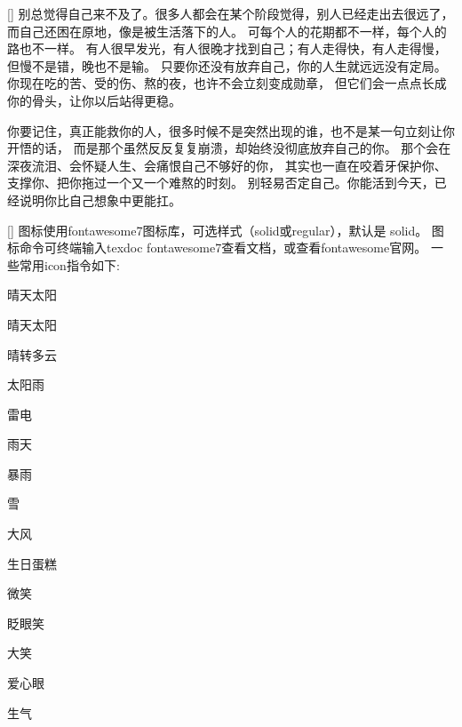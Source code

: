 \documentclass{diary}
\begin{document}
\Address
{}[\faCloudRain]%
别总觉得自己来不及了。很多人都会在某个阶段觉得，别人已经走出去很远了，而自己还困在原地，像是被生活落下的人。
可每个人的花期都不一样，每个人的路也不一样。
有人很早发光，有人很晚才找到自己；有人走得快，有人走得慢，但慢不是错，晚也不是输。
只要你还没有放弃自己，你的人生就远远没有定局。
你现在吃的苦、受的伤、熬的夜，也许不会立刻变成勋章，
但它们会一点点长成你的骨头，让你以后站得更稳。

你要记住，真正能救你的人，很多时候不是突然出现的谁，也不是某一句立刻让你开悟的话，
而是那个虽然反反复复崩溃，却始终没彻底放弃自己的你。
那个会在深夜流泪、会怀疑人生、会痛恨自己不够好的你，
其实也一直在咬着牙保护你、支撑你、把你拖过一个又一个难熬的时刻。
别轻易否定自己。你能活到今天，已经说明你比自己想象中更能扛。

\Address[][家]
[\faCloudSun]%
图标使用fontawesome7图标库，可选样式（solid或regular），默认是 solid。
图标命令可终端输入texdoc fontawesome7查看文档，或查看fontawesome官网。
一些常用icon指令如下:

\faSun\quad\makebox[5cm][l]{\texttt{\string\faSun}}\quad 晴天太阳

\faSun[regular]\quad\makebox[5cm][l]{\texttt{\string\faSun[regular]}}\quad 晴天太阳

\faCloudSun\quad\makebox[5cm][l]{\texttt{\string\faCloudSun}}\quad 晴转多云

\faCloudSunRain\quad\makebox[5cm][l]{\texttt{\string\faCloudSunRain}}\quad 太阳雨

\faCloudBolt\quad\makebox[5cm][l]{\texttt{\string\faCloudBolt}}\quad 雷电

\faCloudRain\quad\makebox[5cm][l]{\texttt{\string\faCloudRain}}\quad 雨天

\faCloudShowersHeavy\quad\makebox[5cm][l]{\texttt{\string\faCloudShowersHeavy}}\quad 暴雨

\faSnowflake\quad\makebox[5cm][l]{\texttt{\string\faSnowflake}}\quad 雪

\faWind\quad\makebox[5cm][l]{\texttt{\string\faWind}}\quad 大风

\faCakeCandles\quad\makebox[5cm][l]{\texttt{\string\faCakeCandles}}\quad 生日蛋糕

\faFaceSmile[regular]\quad\makebox[5cm][l]{\texttt{\string\faFaceSmile[regular]}}\quad 微笑

\faFaceGrinWink\quad\makebox[5cm][l]{\texttt{\string\faFaceGrinWink}}\quad 眨眼笑

\faFaceLaugh[regular]\quad\makebox[5cm][l]{\texttt{\string\faFaceLaugh[regular]}}\quad 大笑

\faFaceGrinHearts\quad\makebox[5cm][l]{\texttt{\string\faFaceGrinHearts}}\quad 爱心眼

\faFaceAngry[regular]\quad\makebox[5cm][l]{\texttt{\string\faFaceAngry[regular]}}\quad 生气
\end{document}
